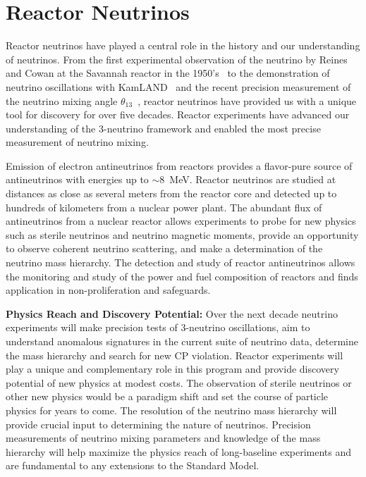 \pagebreak
\section{Reactor Neutrinos}
\label{sec:Reactor}

Reactor neutrinos have played a central role in the history and our
understanding of neutrinos.  From the first experimental observation
of the neutrino by Reines and Cowan at the Savannah reactor in the
1950's~\cite{Reines:1960pr} to the demonstration of neutrino
oscillations with KamLAND~\cite{Abe:2008aa} and the recent precision
measurement of the neutrino mixing angle
$\theta_{13}$~\cite{Abe:2012tg, An:2013zwz}, reactor neutrinos have
provided us with a unique tool for discovery for over five
decades. Reactor experiments have advanced our understanding of the
3-neutrino framework and enabled the most precise measurement of
neutrino mixing.

Emission of electron antineutrinos from reactors provides a
flavor-pure source of antineutrinos with energies up to $\sim$8~MeV. 
Reactor neutrinos are studied at distances as close as several
meters from the reactor core and detected up to hundreds of kilometers
from a nuclear power plant.  The abundant flux of antineutrinos from a
nuclear reactor allows experiments to probe for new physics such as
sterile neutrinos and neutrino magnetic moments, provide an
opportunity to observe coherent neutrino scattering, and make a
determination of the neutrino mass hierarchy. The detection and study
of reactor antineutrinos allows the monitoring and study of the power
and fuel composition of reactors and finds application in
non-proliferation and safeguards.

{\bf Physics Reach and Discovery Potential:}
Over the next decade neutrino experiments will make precision tests of
3-neutrino oscillations, aim to understand anomalous signatures in the
current suite of neutrino data, determine the mass hierarchy and
search for new CP violation. Reactor experiments will play a unique
and complementary role in this program and provide discovery potential
of new physics at modest costs. The observation of sterile neutrinos
or other new physics would be a paradigm shift and set the course of
particle physics for years to come.  The resolution of the neutrino
mass hierarchy will provide crucial input to determining the nature of
neutrinos.  Precision measurements of neutrino mixing parameters and
knowledge of the mass hierarchy will help maximize the physics reach
of long-baseline experiments and are fundamental to any extensions to
the Standard Model.

